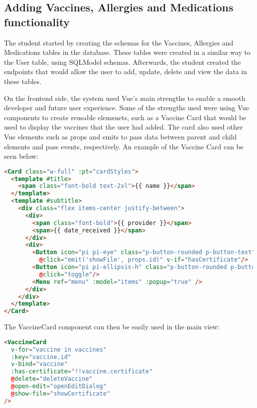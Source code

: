 \subsection{Adding Vaccines, Allergies and Medications functionality}

The student started by creating the schemas for the Vaccines, Allergies and Medications tables in the database. These tables were created in a similar way to the User table, using SQLModel schemas. Afterwards, the student created the endpoints that would allow the user to add, update, delete and view the data in these tables.

On the frontend side, the system used Vue's main strengths to enable a smooth developer and future user experience. Some of the strengths used were using Vue components to create reusable elemenets, such as a Vaccine Card that would be used to display the vaccines that the user had added. The card also used other Vue elements such as props and emits to pass data between parent and child elements and pass events, respectively. An example of the Vaccine Card can be seen below:

\clearpage

\begin{lstlisting}[language=HTML, caption=Vue Vaccine Card Component Example]
<Card class="w-full" :pt="cardStyles">
  <template #title>
    <span class="font-bold text-2xl">{{ name }}</span>
  </template>
  <template #subtitle>
    <div class="flex items-center justify-between">
      <div>
        <span class="font-bold">{{ provider }}</span>
        <span>{{ date_received }}</span> 
      </div>
      <div>
        <Button icon="pi pi-eye" class="p-button-rounded p-button-text"
          @click="emit('showFile', props.id)" v-if="hasCertificate"/>
        <Button icon="pi pi-ellipsis-h" class="p-button-rounded p-button-text"
          @click="toggle"/>
        <Menu ref="menu" :model="items" :popup="true" />
      </div>
    </div>
  </template>
</Card>  
\end{lstlisting}

The VaccineCard component can then be easily used in the main view:

\begin{lstlisting}[language=HTML, caption=Using VaccineCard Component]
<VaccineCard
  v-for="vaccine in vaccines"
  :key="vaccine.id" 
  v-bind="vaccine"
  :has-certificate="!!vaccine.certificate"
  @delete="deleteVaccine"
  @open-edit="openEditDialog"
  @show-file="showCertificate"
/>
\end{lstlisting}


